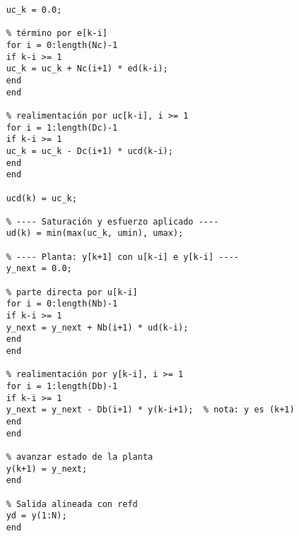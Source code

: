 \begin{lstlisting}[style=matlabstyle,caption={Simulación de lazo discreto con saturación.}]
	% ---- Controlador (sin saturación): uc[k] ----
	uc_k = 0.0;
	
	% término por e[k-i]
	for i = 0:length(Nc)-1
	if k-i >= 1
	uc_k = uc_k + Nc(i+1) * ed(k-i);
	end
	end
	
	% realimentación por uc[k-i], i >= 1
	for i = 1:length(Dc)-1
	if k-i >= 1
	uc_k = uc_k - Dc(i+1) * ucd(k-i);
	end
	end
	
	ucd(k) = uc_k;
	
	% ---- Saturación y esfuerzo aplicado ----
	ud(k) = min(max(uc_k, umin), umax);
	
	% ---- Planta: y[k+1] con u[k-i] e y[k-i] ----
	y_next = 0.0;
	
	% parte directa por u[k-i]
	for i = 0:length(Nb)-1
	if k-i >= 1
	y_next = y_next + Nb(i+1) * ud(k-i);
	end
	end
	
	% realimentación por y[k-i], i >= 1
	for i = 1:length(Db)-1
	if k-i >= 1
	y_next = y_next - Db(i+1) * y(k-i+1);  % nota: y es (k+1)
	end
	end
	
	% avanzar estado de la planta
	y(k+1) = y_next;
	end
	
	% Salida alineada con refd
	yd = y(1:N);
	end
\end{lstlisting}

